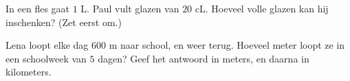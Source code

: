 \begin{exercise}[$\star\star$]\label{exo:g3:measure:10}
In een fles gaat $1$ L. Paul vult glazen van $20$ cL. Hoeveel volle
glazen kan hij inschenken? (Zet eerst om.)
\end{exercise}

\begin{exercise}[$\star\star$]\label{exo:g3:measure:11}
Lena loopt elke dag $600$ m naar school, en weer terug. Hoeveel meter
loopt ze in een schoolweek van $5$ dagen? Geef het antwoord in meters, en
daarna in kilometers.
\end{exercise}
